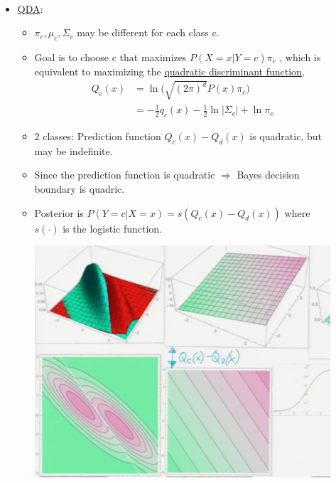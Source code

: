\documentclass[10pt]{article}
\begin{document}
\begin{description}
\begin{itemize}
\begin{align*}
					\end{align*}
				\item \underline{QDA}:
					\begin{itemize}
						\item $\pi_{c}, \mu_{c}, \Sigma_{c}$ may be different for each class c.
						\item Goal is to choose c that maximizes $P(X=x|Y=c)\pi_{c}$ , which is equivalent to maximizing the \underline{quadratic discriminant function},
							\begin{align*}
								Q_{c}(x) &= \ln \Big(\sqrt{(2\pi)^{d}}P(x)\pi_{c}\Big)\\
										&= -\frac{1}{2}q_{c}(x)-\frac{1}{2} \ln |\Sigma_{c}| + \ln \pi_{c}
							\end{align*}
						\item 2 classes: Prediction function $Q_{c}(x) - Q_{d}(x)$ is quadratic, but may be indefinite.
						\item Since the prediction function is quadratic $\Rightarrow$ Bayes decision boundary is quadric.
						\item Posterior is $P(Y=c|X=x) = s(Q_{c}(x) - Q_{d}(x))$ where $s(\cdot)$ is the logistic function.
							\begin{center}
								\includegraphics[scale=0.5]{images/LDA}
							\end{center} 
					\end{itemize}
				

\end{itemize}
\end{description}
\end{document}
